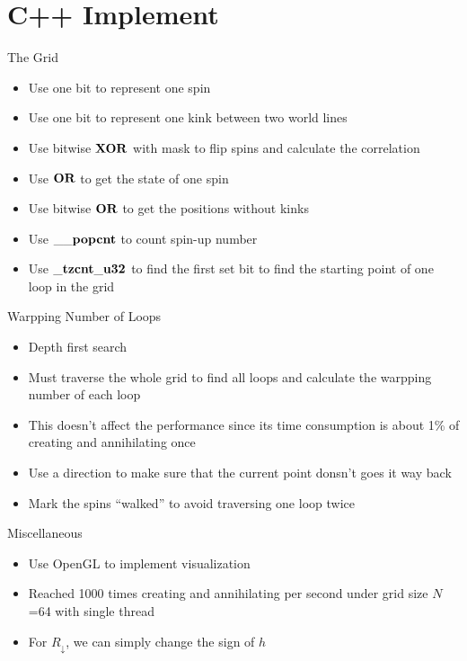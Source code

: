 \documentclass[aspectratio=43]{beamer}
\begin{document}
\section{C++ Implement}
\begin{frame}{The Grid}
  \begin{itemize}
    \item Use one bit to represent one spin
    \item Use one bit to represent one kink between two world lines
    \item Use bitwise $\bf{XOR}$ with mask to flip spins and calculate the correlation
    \item Use $\bf{OR}$ to get the state of one spin
    \item Use bitwise $\bf{OR}$ to get the positions without kinks
    \item Use $\bf{\_\_popcnt}$ to count spin-up number
    \item Use $\bf{\_tzcnt\_u32}$ to find the first set bit to find the starting point of one loop in the grid
  \end{itemize}
\end{frame}

\begin{frame}{Warpping Number of Loops}
  \begin{itemize}
    \item Depth first search
    \item Must traverse the whole grid to find all loops and calculate the warpping number of each loop
    \item This doesn't affect the performance since its time consumption is about 1\% of creating and annihilating once
    \item Use a direction to make sure that the current point donsn't goes it way back
    \item Mark the spins ``walked'' to avoid traversing one loop twice
  \end{itemize}
\end{frame}

\begin{frame}{Miscellaneous}
  \begin{itemize}
    \item Use OpenGL to implement visualization
    \item Reached 1000 times creating and annihilating per second under grid size $N$=64 with single thread
    \item For $R_\downarrow$, we can simply change the sign of $h$
  \end{itemize}
\end{frame}
\end{document}
